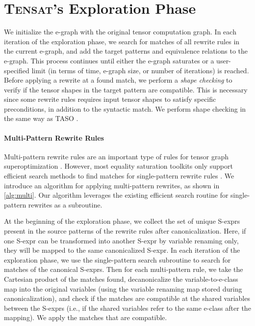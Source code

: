\documentclass{article}
\newcommand{\ourname}[0]{\textsc{Tensat}}
\begin{document}
\section{\ourname{}'s Exploration Phase}
\label{sec:saturation}

We initialize the e-graph with the original tensor computation graph. 
In each iteration of the exploration phase, we search for matches of all rewrite rules in the current e-graph, and add the target patterns and equivalence relations to the e-graph. 
This process continues until either the e-graph saturates or a user-specified limit (in terms of time, e-graph size, or number of iterations) is reached.
Before applying a rewrite at a found match, we perform a \textit{shape checking} to verify if the tensor shapes in the target pattern are compatible.
This is necessary since some rewrite rules requires input tensor shapes to satisfy specific preconditions, in addition to the syntactic match. 
We perform shape checking in the same way as TASO \cite{taso}. 


\paragraph{Multi-Pattern Rewrite Rules}

Multi-pattern rewrite rules are an important type of rules for tensor graph superoptimization \cite{taso}.
However, most equality saturation toolkits only support efficient search methods to find matches for single-pattern rewrite rules \cite{egg, ematching}.
We introduce an algorithm for applying multi-pattern rewrites, as shown in \cref{alg:multi}. Our algorithm leverages the existing efficient search routine for single-pattern rewrites as a subroutine.

At the beginning of the exploration phase, we collect the set of unique S-exprs present in the source patterns of the rewrite rules after canonicalization.
Here, if one S-expr can be transformed into another S-expr by variable renaming only, they will be mapped to the same canonicalized S-expr.
In each iteration of the exploration phase, we use the single-pattern search subroutine to search for matches of the canonical S-exprs. 
Then for each multi-pattern rule, we take the Cartesian product of the matches found, decanonicalize the variable-to-e-class map into the original variables (using the variable renaming map stored during canonicalization), and check if the matches are compatible at the shared variables between the S-exprs (i.e., if the shared variables refer to the same e-class after the mapping). 
We apply the matches that are compatible. 
\end{document}
